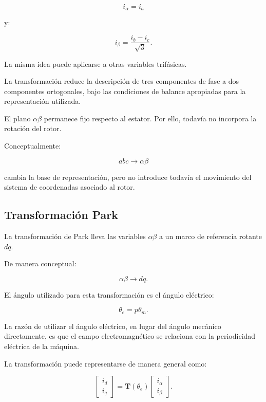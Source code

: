 \begin{equation}
i_\alpha=i_a
\end{equation}

y:

\begin{equation}
i_\beta=
\frac{i_b-i_c}{\sqrt{3}}.
\end{equation}

La misma idea puede aplicarse a otras variables trifásicas.

La transformación reduce la descripción de tres componentes de fase a dos componentes ortogonales, bajo las condiciones de balance apropiadas para la representación utilizada.

El plano $\alpha\beta$ permanece fijo respecto al estator. Por ello, todavía no incorpora la rotación del rotor.

Conceptualmente:

\begin{equation}
abc
\rightarrow
\alpha\beta
\end{equation}

cambia la base de representación, pero no introduce todavía el movimiento del sistema de coordenadas asociado al rotor.

\subsection{Transformación Park}

La transformación de Park lleva las variables $\alpha\beta$ a un marco de referencia rotante $dq$.

De manera conceptual:

\begin{equation}
\alpha\beta
\rightarrow
dq.
\end{equation}

El ángulo utilizado para esta transformación es el ángulo eléctrico:

\begin{equation}
\theta_e=p\theta_m.
\end{equation}

La razón de utilizar el ángulo eléctrico, en lugar del ángulo mecánico directamente, es que el campo electromagnético se relaciona con la periodicidad eléctrica de la máquina.

La transformación puede representarse de manera general como:

\begin{equation}
\begin{bmatrix}
i_d\\
i_q
\end{bmatrix}
=
\mathbf{T}(\theta_e)
\begin{bmatrix}
i_\alpha\\
i_\beta
\end{bmatrix}.
\end{equation}

